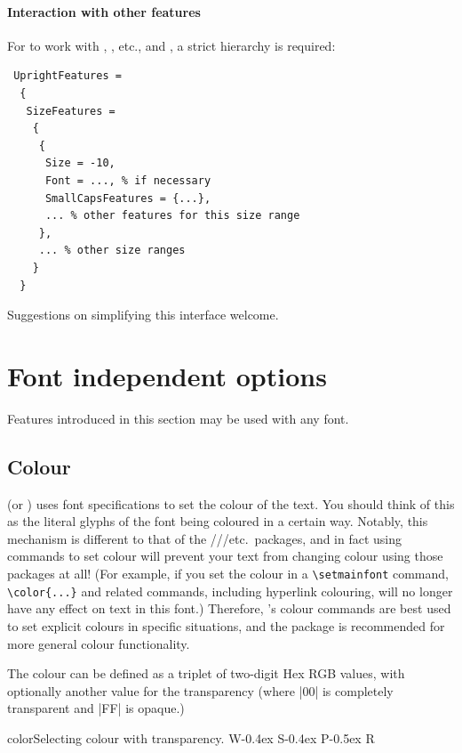 \documentclass[a4paper]{l3doc}
\begin{document}
\paragraph{Interaction with other features}
For  to work with , , etc., and , a strict hierarchy is required:
\begin{Verbatim}
 UprightFeatures =
  {
   SizeFeatures =
    {
     {
      Size = -10,
      Font = ..., % if necessary
      SmallCapsFeatures = {...},
      ... % other features for this size range
     },
     ... % other size ranges
    }
  }
\end{Verbatim}
Suggestions on simplifying this interface welcome.


\section{Font independent options}
\label{sec:font-ind-features}

Features introduced in this section may be used with any font.

\subsection{Colour}

 (or ) uses font specifications to set the colour of
the text.
You should think of this as the literal glyphs of the font being coloured in a certain way.
Notably, this mechanism is different to that of the ///etc.\ packages, and in fact using  commands to set colour will prevent your text from changing colour using those packages at all!
(For example, if you set the colour in a \verb|\setmainfont| command, \verb|\color{...}| and related commands, including hyperlink colouring, will no longer have any effect on text in this font.)
Therefore, 's colour commands are best used to set explicit colours in specific situations, and the  package is recommended for more general colour functionality.

The colour can be defined as a triplet of two-digit Hex RGB
values, with optionally another value for the transparency (where
|00| is completely transparent and |FF| is opaque.)
\begin{Lexample}{color}{Selecting colour with transparency.}
  \fontsize{48}{48}
  {W}\kern-0.4ex
  {S}\kern-0.4ex
  {P}\kern-0.5ex
  {R}
\end{Lexample}
\end{document}
